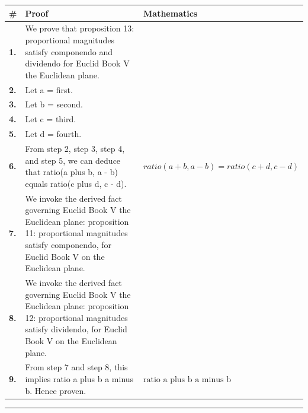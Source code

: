 \documentclass[11pt]{article}
\theoremstyle{definition}
\begin{document}
\begin{tabular}{@{} >{\raggedright\arraybackslash}p{} >{\raggedright\arraybackslash}p{} >{\raggedleft\arraybackslash}p{} @{}}
\textbf{\#} & \textbf{Proof} & \textbf{Mathematics} \\
\midrule
\textbf{1.} & We prove that proposition 13: proportional magnitudes satisfy componendo and dividendo for Euclid Book V the Euclidean plane. & \\[0.45em]
\textbf{2.} & Let a = first. & \\[0.45em]
\textbf{3.} & Let b = second. & \\[0.45em]
\textbf{4.} & Let c = third. & \\[0.45em]
\textbf{5.} & Let d = fourth. & \\[0.45em]
\textbf{6.} & From step 2, step 3, step 4, and step 5, we can deduce that ratio(a plus b, a - b) equals ratio(c plus d, c - d). & $\displaystyle ratio(a + b, a - b) = ratio(c + d, c - d)$ \\[0.45em]
\textbf{7.} & We invoke the derived fact governing Euclid Book V the Euclidean plane: proposition 11: proportional magnitudes satisfy componendo, for Euclid Book V on the Euclidean plane. & \\[0.45em]
\textbf{8.} & We invoke the derived fact governing Euclid Book V the Euclidean plane: proposition 12: proportional magnitudes satisfy dividendo, for Euclid Book V on the Euclidean plane. & \\[0.45em]
\textbf{9.} & From step 7 and step 8, this implies ratio a plus b a minus b. Hence proven. & $\displaystyle \text{ratio a plus b a minus b}$ \\[0.45em]
\bottomrule
\end{tabular}
\label{thm:Geometry-Euclid Book V-proposition_13_proportional_magnitudes_satisfy_componendo_and_dividendo}
\par\medskip\hrule
\end{document}
